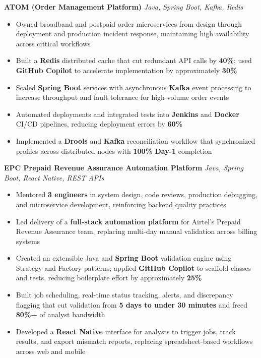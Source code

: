 \documentclass[letterpaper,11pt]{article}
\newcommand{\resumeItem}[1]{
  \item\small{{#1 \vspace{-2pt}}}
}
\newcommand{\resumeItemListStart}{\begin{itemize}}
\newcommand{\resumeItemListEnd}{\end{itemize}\vspace{-5pt}}
\begin{document}
      \vspace{4pt}
      \textbf{\small ATOM (Order Management Platform)} \hfill \textit{\small Java, Spring Boot, Kafka, Redis} \\
      \vspace{-2pt}
      \resumeItemListStart
        \resumeItem{Owned broadband and postpaid order microservices from design through deployment and production incident response, maintaining high availability across critical workflows}
        \resumeItem{Built a \textbf{Redis} distributed cache that cut redundant API calls by \textbf{40\%}; used \textbf{GitHub Copilot} to accelerate implementation by approximately \textbf{30\%}}
        \resumeItem{Scaled \textbf{Spring Boot} services with asynchronous \textbf{Kafka} event processing to increase throughput and fault tolerance for high-volume order events}
        \resumeItem{Automated deployments and integrated tests into \textbf{Jenkins} and \textbf{Docker} CI/CD pipelines, reducing deployment errors by \textbf{60\%}}
        \resumeItem{Implemented a \textbf{Drools} and \textbf{Kafka} reconciliation workflow that synchronized profiles across distributed nodes with \textbf{100\% Day-1} completion}
      \resumeItemListEnd

      \vspace{4pt}
      \textbf{\small EPC Prepaid Revenue Assurance Automation Platform} \hfill \textit{\small Java, Spring Boot, React Native, REST APIs} \\
      \vspace{-2pt}
      \resumeItemListStart
        \resumeItem{Mentored \textbf{3 engineers} in system design, code reviews, production debugging, and microservice development, reinforcing backend quality practices}
        \resumeItem{Led delivery of a \textbf{full-stack automation platform} for Airtel's Prepaid Revenue Assurance team, replacing multi-day manual validation across billing systems}
        \resumeItem{Created an extensible Java and \textbf{Spring Boot} validation engine using Strategy and Factory patterns; applied \textbf{GitHub Copilot} to scaffold classes and tests, reducing boilerplate effort by approximately \textbf{25\%}}
        \resumeItem{Built job scheduling, real-time status tracking, alerts, and discrepancy flagging that cut validation from \textbf{5 days to under 30 minutes} and freed \textbf{80\%+} of analyst bandwidth}
        \resumeItem{Developed a \textbf{React Native} interface for analysts to trigger jobs, track results, and export mismatch reports, replacing spreadsheet-based workflows across web and mobile}
      \resumeItemListEnd
\end{document}
